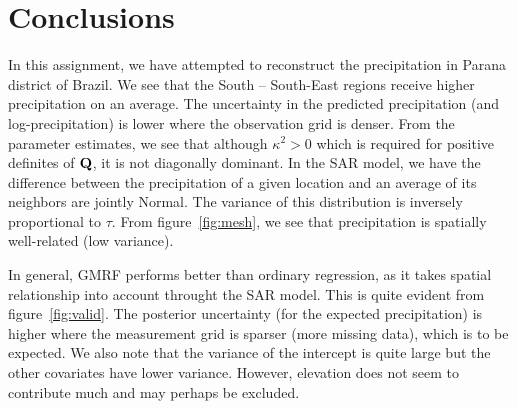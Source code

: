 \documentclass[a4paper,10pt]{article}
\def\bQ{{\bf Q}}
\begin{document}
\section{Conclusions}
In this assignment, we have attempted to reconstruct the precipitation in Parana district of Brazil. We see that the South -- South-East regions receive higher precipitation on an average. The uncertainty in the predicted precipitation (and log-precipitation) is lower where the observation grid is denser. From the parameter estimates, we see that although $\kappa^2 > 0$ which is required for positive definites of $\bQ$, it is not diagonally dominant. In the SAR model, we have the difference between the precipitation of a given location and an average of its neighbors are jointly Normal. The variance of this distribution is inversely proportional to $\tau$. From figure~\ref{fig:mesh}, we see that precipitation is spatially well-related (low variance).

In general, GMRF performs better than ordinary regression, as it takes spatial relationship into account throught the SAR model. This is quite evident from figure~\ref{fig:valid}. The posterior uncertainty (for the expected precipitation) is higher where the measurement grid is sparser (more missing data), which is to be expected. We also note that the variance of the intercept is quite large but the other covariates have lower variance. However, elevation does not seem to contribute much and may perhaps be excluded.
\end{document}
